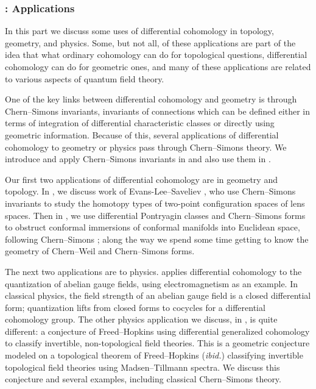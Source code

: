 
\subsubsection{\texorpdfstring{}{Part \ref*{part:applications}}: Applications}
In this part we discuss some uses of differential cohomology in topology, geometry, and physics. Some, but not all,
of these applications are part of the idea that what ordinary cohomology can do for topological questions,
differential cohomology can do for geometric ones, and many of these applications are related to various aspects of
quantum field theory.

One of the key links between differential cohomology and geometry is through Chern--Simons invariants, invariants
of connections which can be defined either in terms of integration of differential characteristic classes or
directly using geometric information. Because of this, several applications of differential cohomology to geometry
or physics pass through Chern--Simons theory. We introduce and apply Chern--Simons invariants in
 and also use them in .

Our first two applications of differential cohomology are in geometry and topology. In , we
discuss work of Evans-Lee--Saveliev \cite{deletedsquare}, who use Chern--Simons invariants to study the homotopy
types of two-point configuration spaces of lens spaces.
Then in , we use differential Pontryagin classes and Chern--Simons forms to obstruct
conformal immersions of conformal manifolds into Euclidean space, following Chern--Simons \cite{cs}; along the way
we spend some time getting to know the geometry of Chern--Weil and Chern--Simons forms.

The next two applications are to physics.  applies differential cohomology to the quantization
of abelian gauge fields, using electromagnetism as an example. In classical physics, the field strength of an
abelian gauge field is a closed differential form; quantization lifts from closed forms to
cocycles for a differential cohomology group. The other physics
application we discuss, in , is quite different: a conjecture of
Freed--Hopkins \cite{FH21} using differential generalized cohomology to classify invertible, non-topological field
theories. This is a geometric conjecture modeled on a topological theorem of Freed--Hopkins (\textit{ibid.})
classifying invertible topological field theories using Madsen--Tillmann spectra.
We discuss this conjecture and several examples, including
classical Chern--Simons theory.

